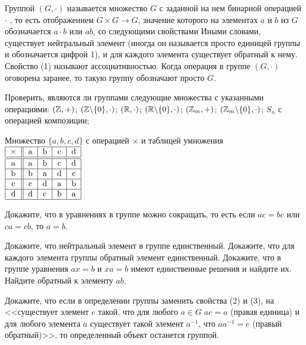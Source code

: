 \documentclass[12pt]{article}
\begin{document}
	Группой $(G, \cdot)$ называется множество $G$ с заданной на нем бинарной операцией $\cdot$ , то есть отображением $G\times G \rightarrow G$, значение которого на элементах $a$ и $b$ из $G$ обозначается $a\cdot b$ или $ab$, со следующими свойствами
		Иными словами, существует нейтральный элемент (иногда он называется просто единицей группы и обозначается цифрой 1), и для каждого элемента существует обратный к нему. Свойство (1) называют ассоциативностью.
	Когда операция в группе $(G, \cdot)$ оговорена заранее, то такую группу обозначают просто $G$.
	
		Проверить, являются ли группами следующие множества с указанными операциями:
		 $(\mathbb{Z},+)$;
		 $(\mathbb{Z} \backslash \{0\},\cdot)$;
		 $(\mathbb{R},\cdot)$;
		 $(\mathbb{R} \backslash \{0\},\cdot)$;
		 $(\mathbb{Z}_m,+)$;
		 $(\mathbb{Z}_m\backslash \{ 0 \},\cdot)$;
		 $S_n$ с операцией композиции;
		

		 Множество $\{a,b,c,d\}$ с операцией $\times$ и таблицей умножения $\tab{|c||c|c|c|c|}{\hline $\times$&a&b&c&d \\ \hline\hline a&a&b&c&d \\ \hline b&b&a&d&c \\ \hline c&c&d&a&b \\ \hline d&d&c&b&a \\ \hline}$

	 Докажите, что в уравнениях в группе можно сокращать, то есть если $ac=bc$ или $ca=cb$, то $a=b$.

	 Докажите, что нейтральный элемент в группе единственный.
	 Докажите, что для каждого элемента группы обратный элемент единственный.
	 Докажите, что в группе уравнения $ax=b$ и $xa=b$ имеют единственные решения и найдите их.
	 Найдите обратный к элементу $ab$.

	Докажите, что если в определении группы заменить свойства (2) и (3), на <<существует элемент $e$ такой, что для любого $a\in G \; ae=a$ (правая единица) и для любого элемента $a$ существует такой элемент $a^{-1}$, что $aa^{-1}=e$ (правый обратный)>>, то определенный объект останется группой.
\end{document}
